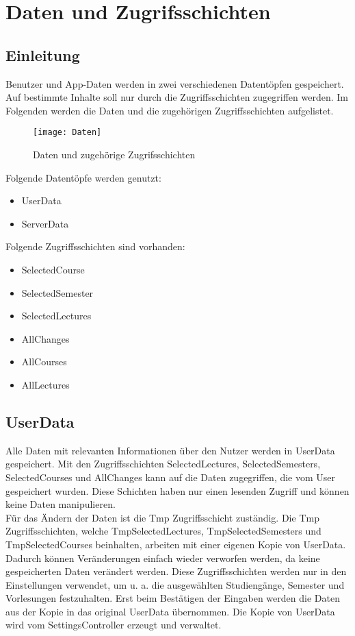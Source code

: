 \chapter{Daten und Zugrifsschichten}
\section{Einleitung}
Benutzer und App-Daten werden in zwei verschiedenen Datentöpfen gespeichert. Auf bestimmte Inhalte soll nur durch die Zugriffsschichten zugegriffen werden. Im Folgenden werden die Daten und die zugehörigen Zugriffsschichten aufgelistet.\\

\begin{figure}[htb]
    \centering
    \texttt{[image: Daten]}
    \caption{Daten und zugehörige Zugrifsschichten}
\end{figure}
\newpage

Folgende Datentöpfe werden genutzt:
\begin{itemize}
     \item UserData
     \item ServerData \\
\end{itemize}

Folgende Zugriffsschichten sind vorhanden:
\begin{itemize}
     \item SelectedCourse
     \item SelectedSemester
     \item SelectedLectures
     \item AllChanges
     \item AllCourses
     \item AllLectures
\end{itemize}

\newpage

\section{UserData}
Alle Daten mit relevanten Informationen über den Nutzer werden in UserData gespeichert. Mit den Zugriffsschichten SelectedLectures, SelectedSemesters, SelectedCourses und AllChanges kann auf die Daten zugegriffen, die vom User gespeichert wurden. Diese Schichten haben nur einen lesenden Zugriff und können keine Daten manipulieren. \\

Für das Ändern der Daten ist die Tmp Zugriffsschicht zuständig. Die Tmp Zugriffsschichten, welche TmpSelectedLectures, TmpSelectedSemesters und TmpSelectedCourses beinhalten, arbeiten mit einer eigenen Kopie von UserData. Dadurch können Veränderungen einfach wieder verworfen werden, da keine gespeicherten Daten verändert werden. Diese Zugriffsschichten werden nur in den Einstellungen verwendet, um u. a. die ausgewählten Studiengänge, Semester und Vorlesungen festzuhalten. Erst beim Bestätigen der Eingaben werden die Daten aus der Kopie in das original UserData übernommen. Die Kopie von UserData wird vom SettingsController erzeugt und verwaltet.\\

